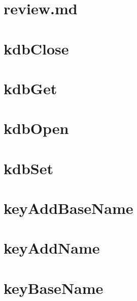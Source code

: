 \let\mypdfximage\pdfximage\def\pdfximage{\immediate\mypdfximage}\documentclass[twoside]{book}
\newcommand{\+}{\discretionary{\mbox{\scriptsize$\hookleftarrow$}}{}{}}
\begin{document}
\chapter{review.\+md}
\label{doc_contrib_api_review_md}

\chapter{kdb\+Close}
\label{doc_contrib_api_reviews_core_kdbClose_md}

\chapter{kdb\+Get}
\label{doc_contrib_api_reviews_core_kdbGet_md}

\chapter{kdb\+Open}
\label{doc_contrib_api_reviews_core_kdbOpen_md}

\chapter{kdb\+Set}
\label{doc_contrib_api_reviews_core_kdbSet_md}

\chapter{key\+Add\+Base\+Name}
\label{doc_contrib_api_reviews_core_keyAddBaseName_md}

\chapter{key\+Add\+Name}
\label{doc_contrib_api_reviews_core_keyAddName_md}

\chapter{key\+Base\+Name}
\label{doc_contrib_api_reviews_core_keyBaseName_md}

\end{document}
